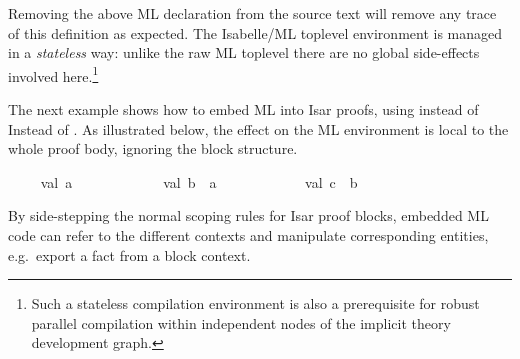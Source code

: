 \begin{isabellebody}
\begin{isamarkuptext}
  Removing the above ML declaration from the source text will remove
  any trace of this definition as expected.  The Isabelle/ML toplevel
  environment is managed in a \emph{stateless} way: unlike the raw ML
  toplevel there are no global side-effects involved
  here.\footnote{Such a stateless compilation environment is also a
  prerequisite for robust parallel compilation within independent
  nodes of the implicit theory development graph.}

  \medskip The next example shows how to embed ML into Isar proofs, using
 \hyperlink{command.ML-prf}{\mbox{}} instead of Instead of \hyperlink{command.ML}{\mbox{}}.
  As illustrated below, the effect on the ML environment is local to
  the whole proof body, ignoring the block structure.%
\end{isamarkuptext}%
\isamarkuptrue%
\isamarkupfalse%
\isanewline
%
\isadelimML
\ \ %
\endisadelimML
%
\isatagML
{}\isamarkupfalse%
\ {\isacharverbatimopen}\ val\ a\ {\isacharequal}\ {}\ {\isacharverbatimclose}\isanewline
\ \ \isacommand{{\isacharbraceleft}}\isamarkupfalse%
\isanewline
\ \ \ \ \isamarkupfalse%
\ {\isacharverbatimopen}\ val\ b\ {\isacharequal}\ a\ {\isacharplus}\ {}\ {\isacharverbatimclose}\isanewline
\ \ \isacommand{{\isacharbraceright}}\isamarkupfalse%
\ %
\isanewline
\ \ \isamarkupfalse%
\ {\isacharverbatimopen}\ val\ c\ {\isacharequal}\ b\ {\isacharplus}\ {}\ {\isacharverbatimclose}\isanewline
{}\isamarkupfalse%
%
\endisatagML
{\isafoldML}%
%
\isadelimML
%
\endisadelimML
%
\begin{isamarkuptext}%
By side-stepping the normal scoping rules for Isar proof
  blocks, embedded ML code can refer to the different contexts and
  manipulate corresponding entities, e.g.\ export a fact from a block
  context.


\end{isamarkuptext}
\end{isabellebody}
